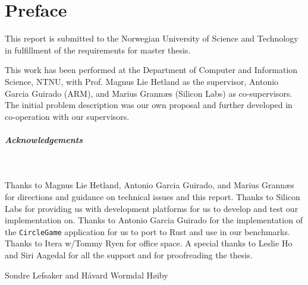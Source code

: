 
\chapter{Preface}
\label{chap:preface}

This report is submitted to the Norwegian University of Science and Technology in fulfillment of the requirements for master thesis.

This work has been performed at the Department of Computer and Information Science, NTNU, with Prof. Magnus Lie Hetland as the supervisor, Antonio Garcia Guirado (ARM), and Marius Grannæs (Silicon Labs) as co-supervisors.
The initial problem description was our own proposal and further developed in co-operation with our supervisors.

\paragraph{Acknowledgements} \\ \hfill

Thanks to Magnus Lie Hetland, Antonio Garcia Guirado, and Marius Grannæs for directions and guidance on technical issues and this report.
Thanks to Silicon Labs for providing us with development platforms for us to develop and test our implementation on.
Thanks to Antonio Garcia Guirado for the implementation of the \texttt{CircleGame} application for us to port to Rust and use in our benchmarks.
Thanks to Itera w/Tommy Ryen for office space.
A special thanks to Leslie Ho and Siri Aagedal for all the support and for proofreading the thesis.

\hfill \break

Sondre Lefsaker and Håvard Wormdal Høiby 

